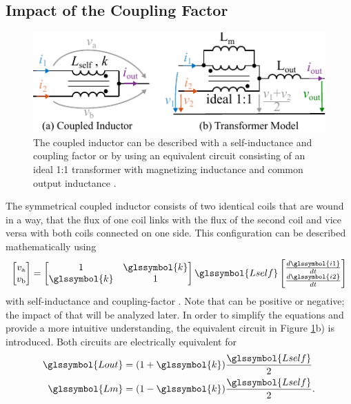 \documentclass{IPEC2026}
\newcommand{\sbl}[1]{\glssymbol{#1}}
\begin{document}
\subsection{Impact of the Coupling Factor}
\begin{figure}
  \includegraphics[width=0.9\columnwidth]{figures/Inkscape/Transformer-Model.pdf}
  \caption{The coupled inductor can be described with a self-inductance \sbl{Lself} and coupling factor \sbl{k} or by using an equivalent circuit consisting of an ideal 1:1 transformer with magnetizing inductance \sbl{Lm} and common output inductance \sbl{Lout}.}
  \label{fig:InductorModel}
\end{figure}
The symmetrical coupled inductor consists of two identical coils that are wound in a way, that the flux of one coil links with the flux of the second coil and vice versa with both coils connected on one side. This configuration can be described mathematically using 
\begin{equation}
  \label{eq:StandardCoupling}
  \begin{bmatrix} v_\mathrm a \\ v_\mathrm b \end{bmatrix} = \begin{bmatrix} 1 & \sbl{k} \\ \sbl{k} & 1 \end{bmatrix} \sbl{Lself} \begin{bmatrix} \frac{d\sbl{i1}}{dt}  \\ \frac{d\sbl{i2}}{dt} \end{bmatrix}
\end{equation}
with self-inductance \sbl{Lself} and coupling-factor \sbl{k}. Note that \sbl{k} can be positive or negative; the impact of that will be analyzed later.
In order to simplify the equations and provide a more intuitive understanding, the equivalent circuit in Figure \ref{fig:InductorModel}b) is introduced. Both circuits are electrically equivalent for
\begin{equation}
  \label{eq:LoutandLmfromk}
  \begin{aligned}
    \sbl{Lout} & = (1+\sbl{k})\frac{\sbl{Lself}}{2} \\
    \sbl{Lm} & = (1-\sbl{k})\frac{\sbl{Lself}}{2}.
  \end{aligned}
\end{equation}
\end{document}
